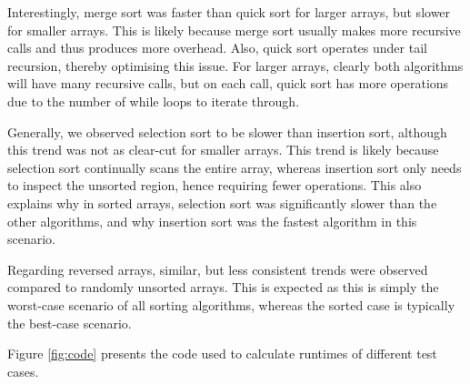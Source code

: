 \documentclass[12pt]{article}
\begin{document}
Interestingly, merge sort was faster than quick sort for larger arrays, but slower for smaller arrays. This is likely because merge sort usually makes more recursive calls and thus produces more overhead. Also, quick sort operates under tail recursion, thereby optimising this issue. For larger arrays, clearly both algorithms will have many recursive calls, but on each call, quick sort has more operations due to the number of while loops to iterate through.

Generally, we observed selection sort to be slower than insertion sort, although this trend was not as clear-cut for smaller arrays. This trend is likely because selection sort continually scans the entire array, whereas insertion sort only needs to inspect  the unsorted region, hence requiring fewer operations. This also explains why in sorted arrays, selection sort was significantly slower than the other algorithms, and why insertion sort was the fastest algorithm in this scenario.

Regarding reversed arrays, similar, but less consistent trends were observed compared to randomly unsorted arrays. This is expected as this is simply the worst-case scenario of all sorting algorithms, whereas the sorted case is typically the best-case scenario.

Figure \ref{fig:code} presents the code used to calculate runtimes of different test cases.
\end{document}
